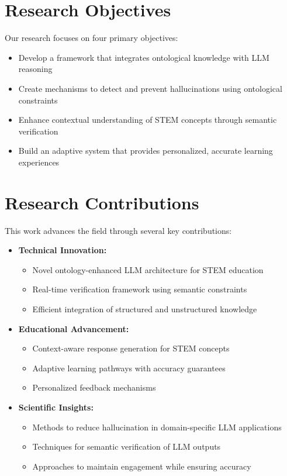 \section{Research Objectives}

Our research focuses on four primary objectives:

\begin{itemize}
    \item Develop a framework that integrates ontological knowledge with LLM reasoning
    \item Create mechanisms to detect and prevent hallucinations using ontological constraints
    \item Enhance contextual understanding of STEM concepts through semantic verification
    \item Build an adaptive system that provides personalized, accurate learning experiences
\end{itemize}

\section{Research Contributions}

This work advances the field through several key contributions:

\begin{itemize}
    \item \textbf{Technical Innovation:}
        \begin{itemize}
            \item Novel ontology-enhanced LLM architecture for STEM education
            \item Real-time verification framework using semantic constraints
            \item Efficient integration of structured and unstructured knowledge
        \end{itemize}
    
    \item \textbf{Educational Advancement:}
        \begin{itemize}
            \item Context-aware response generation for STEM concepts
            \item Adaptive learning pathways with accuracy guarantees
            \item Personalized feedback mechanisms
        \end{itemize}
    
    \item \textbf{Scientific Insights:}
        \begin{itemize}
            \item Methods to reduce hallucination in domain-specific LLM applications
            \item Techniques for semantic verification of LLM outputs
            \item Approaches to maintain engagement while ensuring accuracy
        \end{itemize}
\end{itemize}

